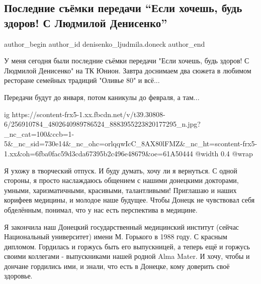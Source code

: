  
 
 
 
 
 
\subsection{Последние съёмки передачи \enquote{Если хочешь, будь здоров! С Людмилой Денисенко}}
\label{sec:16_11_2021.fb.denisenko_ljudmila.doneck.1.teleperedacha}
 
\ifcmt
 author_begin
   author_id denisenko_ljudmila.doneck
 author_end
\fi

У меня сегодня были последние съёмки передачи "Если хочешь, будь здоров! С
Людмилой Денисенко" на ТК Юнион. Завтра доснимаем два сюжета в любимом
ресторане семейных традиций "Оливье 80" и всё...

Передачи будут до января, потом каникулы до февраля, а там... 

\ifcmt
  ig https://scontent-frx5-1.xx.fbcdn.net/v/t39.30808-6/256910784_4802640989786524_8883955223820177295_n.jpg?_nc_cat=100&ccb=1-5&_nc_sid=730e14&_nc_ohc=orlqqwIcC_8AX80lFMZ&_nc_ht=scontent-frx5-1.xx&oh=6fba0fac59d3cda67395b2c496e48679&oe=61A50444
  @width 0.4
  @wrap 
\fi

Я ухожу в творческий отпуск. И буду думать, хочу ли я вернуться. С одной
стороны, я просто наслаждаюсь общением с нашими донецкими докторами, умными,
харизматичными, красивыми, талантливыми! Приглашаю и наших корифеев медицины, и
молодое наше будущее. Чтобы Донецк не чувствовал себя обделённым, понимал, что
у нас есть перспектива в медицине. 

Я закончила наш Донецкий государственный медицинский институт (сейчас
Национальный университет) имени М. Горького в 1988 году. С красным дипломом.
Гордилась и горжусь быть его выпускницей, а теперь ещё и горжусь своими
коллегами - выпускниками нашей родной Alma Mater. И хочу, чтобы и дончане
гордились ими, и знали, что есть в Донецке, кому доверить своё здоровье. 

